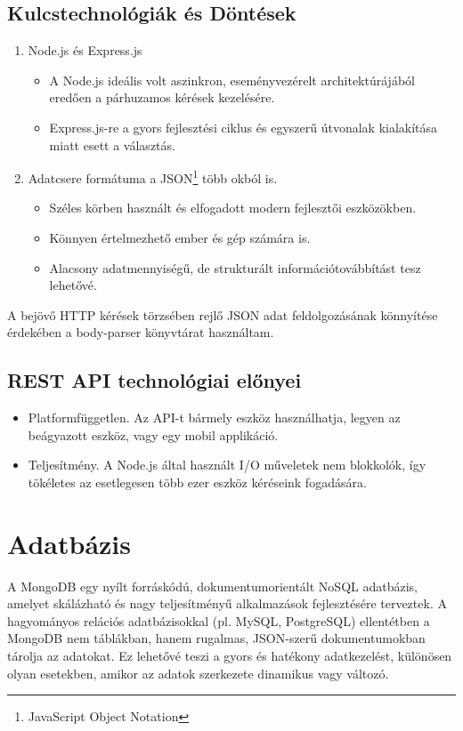 \documentclass{thesis-ekf}
\theoremstyle{definition}
\theoremstyle{remark}
\begin{document}
	\subsection{Kulcstechnológiák és Döntések}
	\begin{enumerate}
		\item Node.js és Express.js
		\begin{itemize}
			\item A Node.js ideális volt aszinkron, eseményvezérelt architektúrájából eredően a párhuzamos kérések kezelésére.
			\item Express.js-re a gyors fejlesztési ciklus és egyszerű útvonalak kialakítása miatt esett a választás.
		\end{itemize}
		\item Adatcsere formátuma a JSON\footnote{JavaScript Object Notation} több okból is.
		\begin{itemize}
			\item Széles körben használt és elfogadott modern fejlesztői eszközökben.
			\item Könnyen értelmezhető ember és gép számára is.
			\item Alacsony adatmennyiségű, de strukturált információtovábbítást tesz lehetővé.
		\end{itemize}
	\end{enumerate}
	A bejövő HTTP kérések törzsében rejlő JSON adat feldolgozásának könnyítése érdekében a body-parser könyvtárat használtam.
	\subsection{REST API technológiai előnyei} 
		\begin{itemize}
			\item Platformfüggetlen. Az API-t bármely eszköz használhatja, legyen az beágyazott eszköz, vagy egy mobil applikáció.
			\item Teljesítmény. A Node.js által használt I/O műveletek nem blokkolók, így tökéletes az esetlegesen több ezer eszköz kéréseink fogadására.
		\end{itemize}
	
	
	\section{Adatbázis}
	A MongoDB egy nyílt forráskódú, dokumentumorientált NoSQL adatbázis, amelyet skálázható és nagy teljesítményű alkalmazások fejlesztésére terveztek. A hagyományos relációs adatbázisokkal (pl. MySQL, PostgreSQL) ellentétben a MongoDB nem táblákban, hanem rugalmas, JSON-szerű dokumentumokban tárolja az adatokat. Ez lehetővé teszi a gyors és hatékony adatkezelést, különösen olyan esetekben, amikor az adatok szerkezete dinamikus vagy változó.
	
\end{document}
